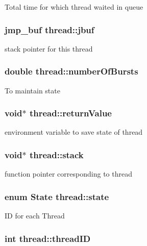 Total time for which thread waited in queue \hypertarget{structthread_a4b52487c0bc57b89ebc094c0ed76932c}{
\subsubsection[{jbuf}]{\setlength{\rightskip}{0pt plus 5cm}jmp\+\_\+buf thread\+::jbuf}}\label{structthread_a4b52487c0bc57b89ebc094c0ed76932c}
stack pointer for this thread \hypertarget{structthread_abe99980c7f19d46445b81fc112773181}{
\subsubsection[{number\+Of\+Bursts}]{\setlength{\rightskip}{0pt plus 5cm}double thread\+::number\+Of\+Bursts}}\label{structthread_abe99980c7f19d46445b81fc112773181}
To maintain state \hypertarget{structthread_a92a58cc20d419199ed0bffb50518e4f0}{
\subsubsection[{return\+Value}]{\setlength{\rightskip}{0pt plus 5cm}void$\ast$ thread\+::return\+Value}}\label{structthread_a92a58cc20d419199ed0bffb50518e4f0}
environment variable to save state of thread \hypertarget{structthread_a33ed512db812fe3068bd059c00ea9c29}{
\subsubsection[{stack}]{\setlength{\rightskip}{0pt plus 5cm}void$\ast$ thread\+::stack}}\label{structthread_a33ed512db812fe3068bd059c00ea9c29}
function pointer corresponding to thread \hypertarget{structthread_aafc49c5d0093246aabe04c0fbe7bc501}{
\subsubsection[{state}]{\setlength{\rightskip}{0pt plus 5cm}enum {\bf State} thread\+::state}}\label{structthread_aafc49c5d0093246aabe04c0fbe7bc501}
I\+D for each Thread \hypertarget{structthread_a1bd7dbc907bd42ad24b2ca7684374e0c}{
\subsubsection[{thread\+I\+D}]{\setlength{\rightskip}{0pt plus 5cm}int thread\+::thread\+I\+D}}\label{structthread_a1bd7dbc907bd42ad24b2ca7684374e0c}

